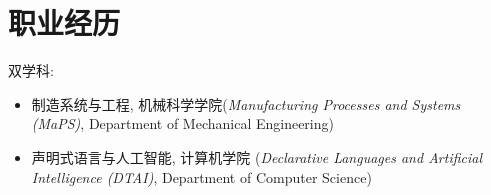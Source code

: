 \documentclass{resume}
\begin{document}

\vspace{5mm}
\section{职业经历}
双学科:
\begin{itemize}
  \item 制造系统与工程, 机械科学学院(\textit{Manufacturing Processes and Systems (MaPS)}, Department of Mechanical Engineering)
  \item 声明式语言与人工智能, 计算机学院 (\textit{Declarative Languages and Artificial Intelligence (DTAI)}, Department of Computer Science)
\end{itemize}
\par


\end{document}
